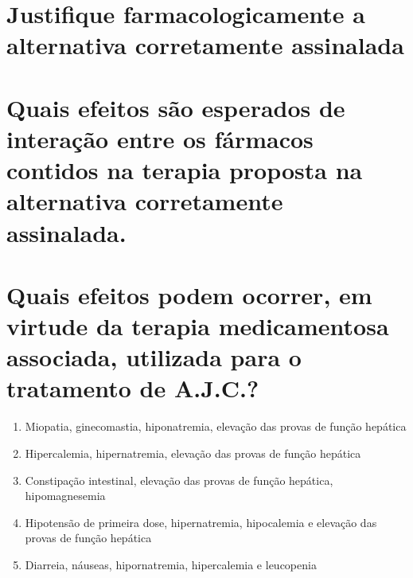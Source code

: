 \documentclass[11pt,notitlepage]{article}
\begin{document}
\section{Justifique farmacologicamente a alternativa corretamente assinalada}
\noindent\makebox[\linewidth]{\rule{\textwidth}{0.5pt}}
\noindent\makebox[\linewidth]{\rule{\textwidth}{0.5pt}}
\noindent\makebox[\linewidth]{\rule{\textwidth}{0.5pt}}
\noindent\makebox[\linewidth]{\rule{\textwidth}{0.5pt}}
\noindent\makebox[\linewidth]{\rule{\textwidth}{0.5pt}}
\noindent\makebox[\linewidth]{\rule{\textwidth}{0.5pt}}
\noindent\makebox[\linewidth]{\rule{\textwidth}{0.5pt}}
\noindent\makebox[\linewidth]{\rule{\textwidth}{0.5pt}}
\noindent\makebox[\linewidth]{\rule{\textwidth}{0.5pt}}
\noindent\makebox[\linewidth]{\rule{\textwidth}{0.5pt}}
\vspace{0.5cm}

\section{Quais efeitos são esperados de interação entre os fármacos contidos na terapia proposta na alternativa corretamente assinalada. }
\noindent\makebox[\linewidth]{\rule{\textwidth}{0.5pt}}
\noindent\makebox[\linewidth]{\rule{\textwidth}{0.5pt}}
\noindent\makebox[\linewidth]{\rule{\textwidth}{0.5pt}}
\noindent\makebox[\linewidth]{\rule{\textwidth}{0.5pt}}
\noindent\makebox[\linewidth]{\rule{\textwidth}{0.5pt}}
\noindent\makebox[\linewidth]{\rule{\textwidth}{0.5pt}}
\noindent\makebox[\linewidth]{\rule{\textwidth}{0.5pt}}
\noindent\makebox[\linewidth]{\rule{\textwidth}{0.5pt}}
\noindent\makebox[\linewidth]{\rule{\textwidth}{0.5pt}}
\noindent\makebox[\linewidth]{\rule{\textwidth}{0.5pt}}
\vspace{0.5cm}

\section{Quais efeitos podem ocorrer, em virtude da terapia medicamentosa associada, utilizada para o tratamento de A.J.C.?}
\begin{multicols}{2}
	\setlength{\columnseprule}{0pt}
	\begin{enumerate}[label=(\alph*)]
		\item Miopatia, ginecomastia, hiponatremia, elevação das provas de função hepática
		\item Hipercalemia, hipernatremia, elevação das provas de função hepática
		\item Constipação intestinal, elevação das provas de função hepática, hipomagnesemia
		\item Hipotensão de primeira dose, hipernatremia, hipocalemia e elevação das provas de função hepática
		\item Diarreia, náuseas, hipornatremia, hipercalemia e leucopenia
	\end{enumerate}
\end{multicols}
\vspace{0.5cm}
\end{document}
